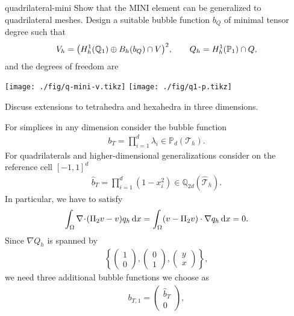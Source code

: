 \begin{Problem}{quadrilateral-mini}
  Show that the MINI element can be generalized to quadrilateral
  meshes. Design a suitable bubble function $b_Q$ of minimal tensor
  degree such that
  \begin{gather*}
    V_h = \bigl(H^1_h(\mathbb Q_1) \oplus B_h(b_Q) \cap V\bigr)^2,
    \qquad
    Q_h = H^1_h(\mathbb P_1) \cap Q,
  \end{gather*}
  and the degrees of freedom are
  \begin{center}
    \texttt{[image: ./fig/q-mini-v.tikz]}
    \hspace{1cm}
    \texttt{[image: ./fig/q1-p.tikz]}
  \end{center}

  Discuss extensions to tetrahedra and hexahedra in three dimensions.
\begin{solution}
  For simplices in any dimension consider the bubble function
  \begin{align*}
    b_T=\prod_{i=1}^d\lambda_i\in \mathbb{P}_d(\mathcal{T}_h).
  \end{align*}
  For quadrilaterals and higher-dimensional generalizations consider
  on the reference cell $[-1,1]^d$
  \begin{align*}
    \hat{b}_T=\prod_{i=1}^d(1-x_i^2)\in \mathbb{Q}_{2d}(\hat{\mathcal{T}}_h).
  \end{align*}
  In particular, we have to satisfy
  \begin{gather*}
    \int_\Omega \nabla\!\cdot\!(\Pi_2 v-v) q_h \,\mathrm{d} x
    = \int_\Omega (v-\Pi_2v)\cdot\nabla q_h\,\mathrm{d} x
    = 0.
  \end{gather*}
  Since $\nabla Q_h$ is spanned by
  \begin{align*}
    \left\{
      \begin{pmatrix} 1 \\0 \end{pmatrix},
      \begin{pmatrix} 0 \\1 \end{pmatrix},
      \begin{pmatrix} y \\x \end{pmatrix}
    \right\},
  \end{align*}
  we need three additional bubble functions we choose as
  \begin{align*}
    b_{T,1}= \begin{pmatrix} \hat{b}_T   \\ 0         \end{pmatrix},

\end{align*}
\end{solution}
\end{Problem}
